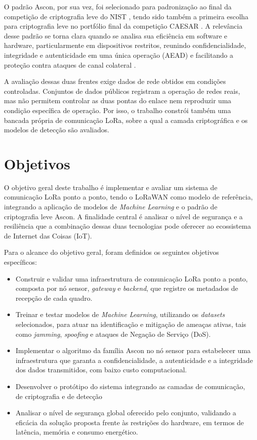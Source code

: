 O padrão Ascon, por sua vez, foi selecionado para padronização ao final da competição de criptografia leve do NIST \cite{nistir8454}, tendo sido também a primeira escolha para criptografia leve no portfólio final da competição CAESAR \cite{caesar_submissions}. A relevância desse padrão se torna clara quando se analisa sua eficiência em software e hardware, particularmente em dispositivos restritos, reunindo confidencialidade, integridade e autenticidade em uma única operação (AEAD) e facilitando a proteção contra ataques de canal colateral \cite{ascon_official}.

A avaliação dessas duas frentes exige dados de rede obtidos em condições controladas. Conjuntos de dados públicos registram a operação de redes reais, mas não permitem controlar as duas pontas do enlace nem reproduzir uma condição específica de operação. Por isso, o trabalho constrói também uma bancada própria de comunicação LoRa, sobre a qual a camada criptográfica e os modelos de detecção são avaliados.



\section{Objetivos}
O objetivo geral deste trabalho é implementar e avaliar um sistema de comunicação LoRa ponto a ponto, tendo o LoRaWAN como modelo de referência, integrando a aplicação de modelos de \textit{Machine Learning} e o padrão de criptografia leve Ascon. A finalidade central é analisar o nível de segurança e a resiliência que a combinação dessas duas tecnologias pode oferecer ao ecossistema de Internet das Coisas (IoT).

Para o alcance do objetivo geral, foram definidos os seguintes objetivos específicos:

\begin{itemize}
    \item Construir e validar uma infraestrutura de comunicação LoRa ponto a ponto, composta por nó sensor, \textit{gateway} e \textit{backend}, que registre os metadados de recepção de cada quadro.
    \item Treinar e testar modelos de \textit{Machine Learning}, utilizando os \textit{datasets} selecionados, para atuar na identificação e mitigação de ameaças ativas, tais como \textit{jamming}, \textit{spoofing} e ataques de Negação de Serviço (DoS).
    \item Implementar o algoritmo da família Ascon no nó sensor para estabelecer uma infraestrutura que garanta a confidencialidade, a autenticidade e a integridade dos dados transmitidos, com baixo custo computacional.
    \item Desenvolver o protótipo do sistema integrando as camadas de comunicação, de criptografia e de detecção
    \item Analisar o nível de segurança global oferecido pelo conjunto, validando a eficácia da solução proposta frente às restrições do hardware, em termos de latência, memória e consumo energético.
\end{itemize}

